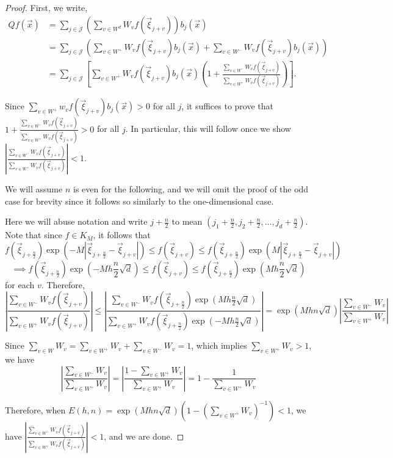 \documentclass[10pt]{article}
\newcommand{\fracn}{\frac{n}{2}}
\theoremstyle{definition}
\numberwithin{equation}{section}
\numberwithin{figure}{section}
\numberwithin{table}{section}
\begin{document}
\begin{proof}
First, we write,
\begin{align*}
     Qf(\vec{x})&=\sum_{j\in \mathcal{J}}\left(\sum_{v\in W^d}W_vf(\vec{\xi}_{j+v})\right)b_j(\vec{x})\\
    &=\sum_{j\in\mathcal{J}}\left(\sum_{v\in W^+}W_vf(\vec\xi_{j+v})b_j(\vec x)+\sum_{v\in W^-}W_vf(\vec\xi_{j+v})b_j(\vec{x})\right)\\
    &=\sum_{j\in\mathcal{J}}\left[\sum_{v\in W^+}W_vf(\vec\xi_{j+v})b_j(\vec x)\left(1+\frac{\sum_{v\in W^-}W_vf(\vec\xi_{j+v})}{\sum_{v\in W^+}W_vf(\vec\xi_{j+v})}\right)\right].
\end{align*}

Since $\sum_{v\in W^+}w_vf(\vec\xi_{j+v})b_j(\vec x)>0$ for all $j$, it suffices to prove that $1+\frac{\sum_{v\in W^-}W_vf(\vec\xi_{j+v})}{\sum_{v\in W^+}W_vf(\vec\xi_{j+v})}>0$ for all $j$. In particular, this will follow once we show $\left|\frac{\sum_{v\in W^-}W_vf(\vec\xi_{j+v})}{\sum_{v\in W^+}W_vf(\vec\xi_{j+v})}\right|<1$.

We will assume $n$ is even for the following, and we will omit the proof of the odd case for brevity since it follows so similarly to the one-dimensional case. 

Here we will abuse notation and write $j+\fracn$ to mean $(j_1+\fracn,j_2+\fracn,\dots,j_d+\fracn)$. Note that since $f\in K_M$, it follows that
$$f(\vec\xi_{j+\fracn})\exp(-M|\vec\xi_{j+\fracn}-\vec\xi_{j+v}|)\leq f(\vec\xi_{j+v})\leq f(\vec\xi_{j+\fracn})\exp(M|\vec\xi_{j+\fracn}-\vec\xi_{j+v}|)$$
$$\implies f(\vec\xi_{j+\fracn})\exp\left(-Mh\fracn\sqrt{d}\right)\leq f(\vec\xi_{j+v})\leq f(\vec\xi_{j+\fracn})\exp\left(Mh\fracn\sqrt{d}\right)$$
for each $v$. Therefore,
$$\left|\frac{\sum_{v\in W^-}W_vf(\vec\xi_{j+v})}{\sum_{v\in W^+}W_vf(\vec\xi_{j+v})}\right|\leq\left|\frac{\sum_{v\in W^-}W_vf(\vec\xi_{j+\fracn})\exp(Mh\fracn\sqrt{d})}{\sum_{v\in W^+}W_vf(\vec\xi_{j+\fracn})\exp(-Mh\fracn\sqrt{d})}\right|=\exp(Mhn\sqrt{d})\left|\frac{\sum_{v\in W^-}W_v}{\sum_{v\in W^+}W_v}\right|$$

Since $\sum_{v\in W}W_v=\sum_{v\in W^+}W_v+\sum_{v\in W^-}W_v=1$, which implies $\sum_{v\in W^+}W_v>1$, we have
$$\left|\frac{\sum_{v\in W^-}W_v}{\sum_{v\in W^+}W_v}\right|=\left|\frac{1-\sum_{v\in W^+}W_v}{\sum_{v\in W^+}W_v}\right|=1-\frac{1}{\sum_{v\in W^+}W_v}$$

Therefore, when $E(h,n)=\exp(Mhn\sqrt{d})(1-(\sum_{v\in W^+}W_v)^{-1})<1$, we have $\left|\frac{\sum_{v\in W^-}W_vf(\vec\xi_{j+v})}{\sum_{v\in W^+}W_vf(\vec\xi_{j+v})}\right|<1$, and we are done.
\end{proof}
\end{document}
